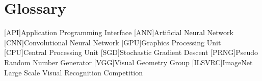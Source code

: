 \chapter{Glossary}

\footnotesize
\SingleSpacing

\begin{multicols}{2}
\begin{acronym}[AAAAAA]

	[API]{Application Programming Interface}
	[ANN]{Artificial Neural Network}
	[CNN]{Convolutional Neural Network}
	[GPU]{Graphics Processing Unit}
	[CPU]{Central Processing Unit}
	[SGD]{Stochastic Gradient Descent}
	[PRNG]{Pseudo Random Number Generator}
	[VGG]{Visual Geometry Group}
    [ILSVRC]{ImageNet Large Scale Visual Recognition Competition}

\end{acronym}
\end{multicols}
